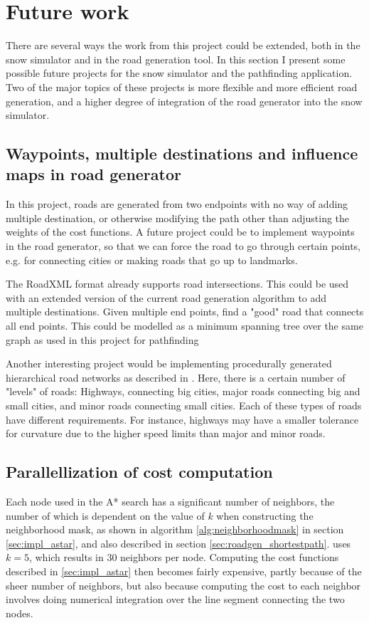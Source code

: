 \chapter{Future work}
\label{chap:futurework}
There are several ways the work from this project could be extended, both in the snow simulator and in the road generation tool. In this section I present some possible future projects for the snow simulator and the pathfinding application. Two of the major topics of these projects is more flexible and more efficient road generation, and a higher degree of integration of the road generator into the snow simulator.

\section{Waypoints, multiple destinations and influence maps in road generator}
In this project, roads are generated from two endpoints with no way of adding multiple destination, or otherwise modifying the path other than adjusting the weights of the cost functions. A future project could be to implement waypoints in the road generator, so that we can force the road to go through certain points, e.g. for connecting cities or making roads that go up to landmarks. 

The RoadXML format already supports road intersections. This could be used with an extended version of the current road generation algorithm to add multiple destinations. Given multiple end points, find a "good" road that connects all end points. This could be modelled as a minimum spanning tree over the same graph as used in this project for pathfinding

Another interesting project would be implementing procedurally generated hierarchical road networks as described in \cite{roadgen2}. Here, there is a certain number of "levels" of roads: Highways, connecting big cities, major roads connecting big and small cities, and minor roads connecting small cities. Each of these types of roads have different requirements. For instance, highways may have a smaller tolerance for curvature due to the higher speed limits than major and minor roads. 


\section{Parallellization of cost computation}
\label{sec:future_parallellization}
Each node used in the A* search has a significant number of neighbors, the number of which is dependent on the value of $k$ when constructing the neighborhood mask, as shown in algorithm \ref{alg:neighborhoodmask} in section \ref{sec:impl_astar}, and also described in section \ref{sec:roadgen_shortestpath}. \cite{roadgen} uses $k=5$, which results in 30 neighbors per node. Computing the cost functions described in \ref{sec:impl_astar} then becomes fairly expensive, partly because of the sheer number of neighbors, but also because computing the cost to each neighbor involves doing numerical integration over the line segment connecting the two nodes.

